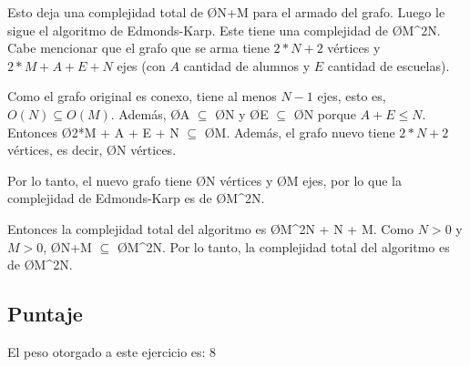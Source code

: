 Esto deja una complejidad total de \O{N+M} para el armado del grafo. Luego le sigue el algoritmo de Edmonds-Karp. Este tiene una complejidad de \O{M^2N}. Cabe mencionar que el grafo que se arma tiene $2*N+2$ vértices y $2*M + A + E + N$ ejes (con $A$ cantidad de alumnos y $E$ cantidad de escuelas). 


Como el grafo original es conexo, tiene al menos $N-1$ ejes, esto es,  $O(N) \subseteq O(M)$. Además, \O{A} $\subseteq$ \O{N} y \O{E} $\subseteq$ \O{N} porque $A+E \leq N$. Entonces \O{2*M + A + E + N} $\subseteq$ \O{M}. Además, el grafo nuevo tiene $2*N+2$ vértices, es decir, \O{N} vértices. 

Por lo tanto, el nuevo grafo tiene \O{N} vértices y \O{M} ejes, por lo que la complejidad de Edmonds-Karp es de \O{M^2N}.

Entonces la complejidad total del algoritmo es \O{M^2N + N + M}. Como $N > 0$ y $M>0$, \O{N+M} $\subseteq$ \O{M^2N}. Por lo tanto, la complejidad total del algoritmo es de \O{M^2N}.

\subsection{Puntaje}
El peso otorgado a este ejercicio es: 8